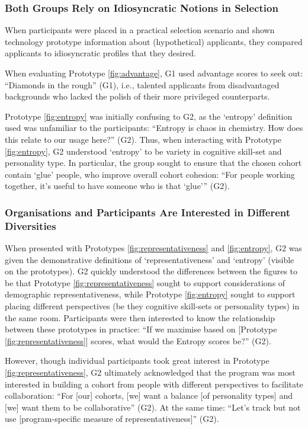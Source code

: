 \subsubsection{Both Groups Rely on Idiosyncratic Notions in Selection}
When participants were placed in a practical selection scenario and shown technology prototype information about (hypothetical) applicants, they compared applicants to idiosyncratic profiles that they desired.

When evaluating Prototype \ref{fig:advantage}, G1 used advantage scores to seek out: ``Diamonds in the rough'' (G1), i.e., talented applicants from disadvantaged backgrounds who lacked the polish of their more privileged counterparts.

Prototype \ref{fig:entropy} was initially confusing to G2, as the `entropy' definition used was unfamiliar to the participants: ``Entropy is chaos in chemistry. How does this relate to our usage here?'' (G2). Thus, when interacting with Prototype \ref{fig:entropy}, G2 understood `entropy' to be variety in cognitive skill-set and personality type. In particular, the group sought to ensure that the chosen cohort contain `glue' people, who improve overall cohort cohesion: ``For people working together, it's useful to have someone who is that `glue''' (G2). 

\subsubsection{Organisations and Participants Are Interested in Different Diversities}
When presented with Prototypes \ref{fig:representativeness} and \ref{fig:entropy}, G2 was given the demonstrative definitions of `representativeness' and `entropy' (visible on the prototypes). G2 quickly understood the differences between the figures to be that Prototype \ref{fig:representativeness} sought to support considerations of demographic representativeness, while Prototype \ref{fig:entropy} sought to support placing different perspectives (be they cognitive skill-sets or personality types) in the same room. Participants were then interested to know the relationship between these prototypes in practice: ``If we maximise based on [Prototype \ref{fig:representativeness}] scores, what would the Entropy scores be?'' (G2).

However, though individual participants took great interest in Prototype \ref{fig:representativeness}, G2 ultimately acknowledged that the program was most interested in building a cohort from people with different perspectives to facilitate collaboration: ``For [our] cohorts, [we] want a balance [of personality types] and [we] want them to be collaborative'' (G2). At the same time: ``Let's track but not use [program-specific measure of representativeness]'' (G2).

